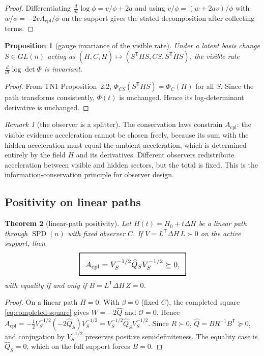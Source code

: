 \documentclass[11pt,a4paper]{article}
\numberwithin{equation}{section}
\newcommand{\geomboxed}[1]{%
  \setlength{\fboxsep}{8pt}%
  \setlength{\fboxrule}{0.9pt}%
  \fbox{\scalebox{1.10}{$\displaystyle #1$}}%
}
\theoremstyle{thmcompact}
\newtheorem{theorem}{Theorem}[section]
\newtheorem{proposition}[theorem]{Proposition}
\theoremstyle{remark}
\newtheorem*{remarkplain}{Remark}
\newenvironment{remark}[1][]%
{\begin{remarkbox}\begin{remarkplain}[#1]\normalfont}
{\end{remarkplain}\end{remarkbox}}
\begin{document}
\begin{proof}
Differentiating $\frac{d}{dt}\log\phi=v/\phi+2a$ and using $\dot v/\phi=(w+2av)/\phi$ with $w/\phi=-2vA_{\mathrm{cpl}}/\phi$ on the support gives the stated decomposition after collecting terms.
\end{proof}

\begin{proposition}[gauge invariance of the visible rate]\label{prop:gauge-invariance}
Under a latent basis change $S\in GL(n)$ acting as $(H,C,\dot H)\mapsto (S^{\mathsf T}HS,CS,S^{\mathsf T}\dot H S)$, the visible rate $\frac{d}{dt}\log\det\Phi$ is invariant.
\end{proposition}

\begin{proof}
From TN1 Proposition~2.2, $\Phi_{CS}(S^{\mathsf T}HS)=\Phi_C(H)$ for all $S$. Since the path transforms consistently, $\Phi(t)$ is unchanged. Hence its log-determinant derivative is unchanged.
\end{proof}

\begin{remark}[the observer is a splitter]
The conservation laws constrain $A_{\mathrm{cpl}}$: the visible evidence acceleration cannot be chosen freely, because its sum with the hidden acceleration must equal the ambient acceleration, which is determined entirely by the field $H$ and its derivatives. Different observers redistribute acceleration between visible and hidden sectors, but the total is fixed. This is the information-conservation principle for observer design.
\end{remark}

\subsection{Positivity on linear paths}

\begin{theorem}[linear-path positivity]\label{thm:linear-positivity}
Let $H(t)=H_0+t\Delta H$ be a linear path through $\operatorname{SPD}(n)$ with fixed observer $C$. If $V=L^{\mathsf T}\Delta H\,L\succ 0$ on the active support, then
\begin{equation}
\geomboxed{A_{\mathrm{cpl}}=V_S^{-1/2}\widehat Q_SV_S^{-1/2}\succeq 0,}
\label{eq:linear-positivity}
\end{equation}
with equality if and only if $B=L^{\mathsf T}\Delta H\,Z=0$.
\end{theorem}

\begin{proof}
On a linear path $\ddot H=0$. With $\beta=0$ (fixed $C$), the completed square \eqref{eq:completed-square} gives $W=-2\widehat Q$ and $\mathcal O=0$. Hence $A_{\mathrm{cpl}}=-\frac12V_S^{-1/2}(-2\widehat Q_S)V_S^{-1/2}=V_S^{-1/2}\widehat Q_SV_S^{-1/2}$. Since $R\succ 0$, $\widehat Q=BR^{-1}B^{\mathsf T}\succeq 0$, and conjugation by $V_S^{-1/2}$ preserves positive semidefiniteness. The equality case is $\widehat Q_S=0$, which on the full support forces $B=0$.
\end{proof}
\end{document}
